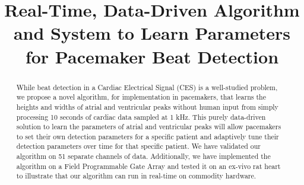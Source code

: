 \documentclass[conference]{IEEEtran}
\begin{document}
%
\title{Real-Time, Data-Driven Algorithm and System to Learn
Parameters for Pacemaker Beat Detection}


\author{
}







\maketitle

\begin{abstract}
While beat detection in a Cardiac Electrical 
Signal (CES) is a well-studied problem, we propose a novel
algorithm, for implementation in pacemakers, that learns the
heights and widths of atrial and ventricular peaks without human input from simply
processing 10 seconds of cardiac data sampled at 1 kHz. 
This purely data-driven solution to learn the parameters of atrial
and ventricular peaks will allow pacemakers to set their own %
detection parameters for a specific patient and adaptively tune
their detection parameters over time for that specific patient.
We have validated our algorithm on 51 separate channels of
data. Additionally, we have implemented the algorithm on a
Field Programmable Gate Array and tested it on an ex-vivo rat
heart to illustrate that our algorithm can run in real-time on commodity hardware.
\end{abstract}
\end{document}
